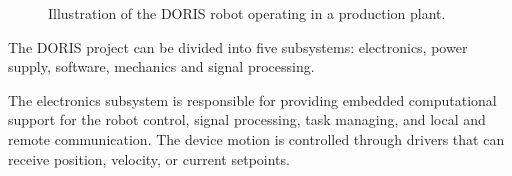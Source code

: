 \documentclass{ifacconf}
\begin{document}
\begin{figure}[ht]
\centering
{} 
\vspace{-.1cm}
\caption{Illustration of the DORIS robot operating in a production plant.}\vspace{-0.25cm}
\label{fig:DORIS-overview}
\end{figure}

The DORIS project can be divided into five subsystems: electronics, power
supply, software, mechanics and signal processing.

The electronics subsystem is responsible for providing embedded computational
support for the robot control, signal processing, task managing, and local and
remote communication. The device motion is controlled through drivers that can
receive position, velocity, or current setpoints.%

\end{document}
